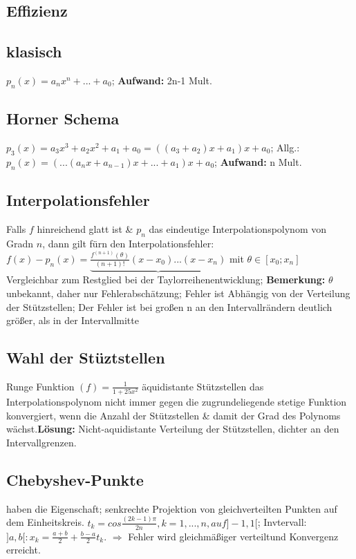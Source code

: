 \subsection{Effizienz}
\subsection{klasisch}
$ p_{n} (x) = a_{n} x^{n} + ... + a_{0} $; 
\textbf{Aufwand:} 2n-1 Mult.
\subsection{Horner Schema}
$ p_{3} (x) = a_{3} x^{3} + a_{2} x^{2} + a_{1} + a_{0} = (( a_{3} + a_{2} ) x + a_{1} )x+ a_{0} $; 
Allg.: $ p_{n} (x) = ( ... ( a_{n} x + a_{n-1} ) x + ... + a_{1} ) x + a_{0} $; 
\textbf{Aufwand:} n Mult.

\subsection{Interpolationsfehler}
Falls $ f $ hinreichend glatt ist \& $ p_{n} $ das eindeutige Interpolationspolynom von Gradn $ n $, dann gilt fürn den Interpolationsfehler:
$ f(x) - p_{n}(x) = \underbrace{ \frac{ f^{ ( n+1 ) }( \theta ) }{ ( n+1) ! } ( x-x_{0} )...( x-x_{n} ) } $ mit $ \theta \in [ x_{0}; x_{n} ]  $\\
Vergleichbar zum Restglied bei der Taylorreihenentwicklung; 
\textbf{Bemerkung:} $ \theta $ unbekannt, daher nur Fehlerabschätzung; 
Fehler ist Abhängig von der Verteilung der Stützstellen; 
Der Fehler ist bei großen n an den Intervallrändern deutlich größer, als in der Intervallmitte
\subsection{Wahl der Stüztstellen}
Runge Funktion $ (f) = \frac{ 1 }{ 1+25x^{2} } $ äquidistante Stützstellen das Interpolationspolynom nicht immer gegen die zugrundeliegende stetige Funktion konvergiert, wenn die Anzahl der Stützstellen \& damit der Grad des Polynoms wächst.\textbf{Lösung:}  Nicht-aquidistante Verteilung der Stützstellen, dichter an den Intervallgrenzen.
\subsection{Chebyshev-Punkte}
haben die Eigenschaft; senkrechte Projektion von gleichverteilten Punkten auf dem Einheitskreis. $ t_{k} = cos\frac{ ( 2k-1 ) \pi }{ 2n }, k=1,...,n, auf ]-1,1[ $;  Invtervall: $ ]a,b[: x_{k} = \frac{ a +b }{2} + \frac{ b-a }{ 2 } t_{k} $. $\Rightarrow$ Fehler wird gleichmäßiger verteiltund Konvergenz erreicht.
